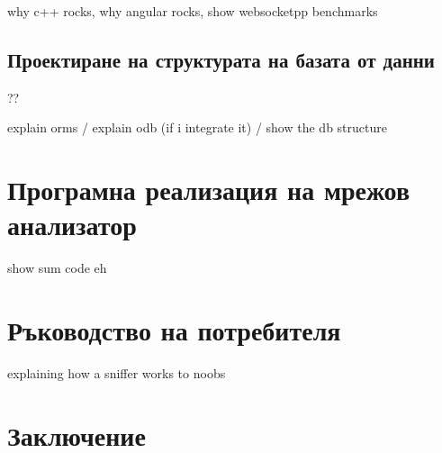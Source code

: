 \documentclass[12pt,a4paper,oneside]{book}
\begin{document}
why c++ rocks, why angular rocks, show websocketpp benchmarks

\section{Проектиране на структурата на базата от данни}

??

explain orms / explain odb (if i integrate it) / show the db structure

\chapter{Програмна реализация на мрежов анализатор}

show sum code eh

\chapter{Ръководство на потребителя}

explaining how a sniffer works to noobs

\chapter{Заключение}
\end{document}
